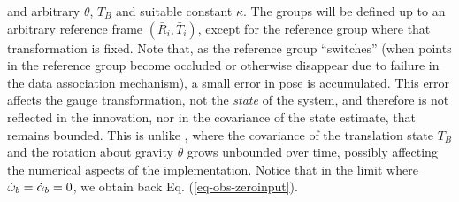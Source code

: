 and arbitrary $\theta$, $T_B$ and suitable constant $\kappa$. The groups will be defined up to an arbitrary reference frame $(\bar R_i, \bar T_i)$, except for the reference group where that transformation is fixed. 
Note that, as the reference group ``switches'' (when points in the reference group become occluded or otherwise disappear due to failure in the data association mechanism), a small error in pose is accumulated. 
This error affects the gauge transformation, not the {\em state} of the system, and therefore is not reflected in the innovation, nor in the covariance of the state estimate, that remains bounded. 
This is unlike \cite{roumeliotisM}, where the covariance of the translation state $T_B$ and the rotation about gravity $\theta$ grows unbounded over time, possibly affecting the numerical aspects of the implementation. 
Notice that in the limit where $\dot {\omega}_b = \dot \alpha_b =0$, we obtain back Eq. (\ref{eq-obs-zeroinput}).
